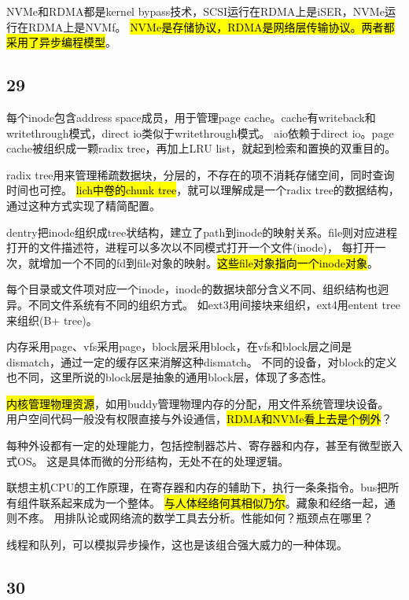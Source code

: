 NVMe和RDMA都是kernel bypass技术，SCSI运行在RDMA上是iSER，NVMe运行在RDMA上是NVMf。
\hl{NVMe是存储协议，RDMA是网络层传输协议。两者都采用了异步编程模型}。

\subsection{29}

每个inode包含address space成员，用于管理page cache。cache有writeback和writethrough模式，direct io类似于writethrough模式。
aio依赖于direct io。page cache被组织成一颗radix tree，再加上LRU list，就起到检索和置换的双重目的。

radix tree用来管理稀疏数据块，分层的，不存在的项不消耗存储空间，同时查询时间也可控。
\hl{lich中卷的chunk tree}，就可以理解成是一个radix tree的数据结构，通过这种方式实现了精简配置。

dentry把inode组织成tree状结构，建立了path到inode的映射关系。file则对应进程打开的文件描述符，进程可以多次以不同模式打开一个文件(inode)，
每打开一次，就增加一个不同的fd到file对象的映射。\hl{这些file对象指向一个inode对象}。

每个目录或文件项对应一个inode，inode的数据块部分含义不同、组织结构也迥异。不同文件系统有不同的组织方式。
如ext3用间接块来组织，ext4用entent tree来组织(B+ tree)。

内存采用page、vfs采用page，block层采用block，在vfs和block层之间是dismatch，通过一定的缓存区来消解这种dismatch。
不同的设备，对block的定义也不同，这里所说的block层是抽象的通用block层，体现了多态性。

\dotfill

\hl{内核管理物理资源}，如用buddy管理物理内存的分配，用文件系统管理块设备。
用户空间代码一般没有权限直接与外设通信，\hl{RDMA和NVMe看上去是个例外}？

每种外设都有一定的处理能力，包括控制器芯片、寄存器和内存，甚至有微型嵌入式OS。
这是具体而微的分形结构，无处不在的处理逻辑。

联想主机CPU的工作原理，在寄存器和内存的辅助下，执行一条条指令。bus把所有组件联系起来成为一个整体。
\hl{与人体经络何其相似乃尔}。藏象和经络一起，通则不疼。
用排队论或网络流的数学工具去分析。性能如何？瓶颈点在哪里？

\dotfill

线程和队列，可以模拟异步操作，这也是该组合强大威力的一种体现。

\subsection{30}
